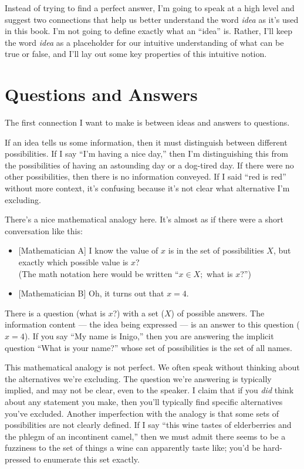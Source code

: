 \documentclass[9pt, twoside]{book}
\theoremstyle{argtstyle}
\begin{document}
Instead of trying to find a perfect answer, I'm going to speak at a high level
and suggest two connections that help us better understand the word {\em idea}
as it's used in this book.
I'm not going to define exactly what an ``idea'' is.
Rather, I'll keep the word {\em idea} as a placeholder for our
intuitive understanding of what can be true or false, and I'll lay out some key
properties of this intuitive notion.

\section{Questions and Answers}

The first connection I want to make is between ideas and answers to questions.

If an idea tells us some information, then it must distinguish between different
possibilities. If I say ``I'm having a nice day,'' then I'm distinguishing this
from the possibilities of having an astounding day or a dog-tired day.
If there were no other possibilities,
then there is no information conveyed. If I said
``red is red'' without more context,
it's confusing because it's not clear what
alternative I'm excluding.

There's a nice mathematical analogy here. It's almost as if there were a short
conversation like this:
\begin{itemize}
    \item{} [Mathematician A] I know the value of $x$ is in the set of
        possibilities $X$, but exactly which possible value is $x$?\\
        (The math notation here would be written ``$x\in X;$ what is $x$?'')
    \item{} [Mathematician B] Oh, it turns out that $x=4$.
\end{itemize}
There is a question (what is $x$?) with a set ($X$) of possible answers. The
information content --- the idea being expressed ---
is an answer to this question ($x=4$). If you say ``My name is Inigo,''
then you are answering the implicit question ``What is your name?'' whose set of
possibilities is the set of all names.

This mathematical analogy is not perfect.
We often speak without thinking about the
alternatives we're excluding.
The question we're answering
is typically implied, and may not be clear, even to
the speaker.
I claim that if you {\em did} think about any statement
you
make, then
you'll typically find specific alternatives you've excluded.
Another imperfection with the analogy is that some sets of possibilities are not
clearly defined.
If I say ``this wine tastes of
elderberries and the phlegm of an incontinent camel,'' then we must admit there
seems to be a fuzziness to the set of things a wine can apparently taste like;
you'd be hard-pressed to enumerate this set exactly.
\end{document}
